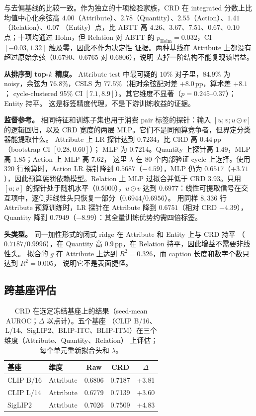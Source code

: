 \documentclass[10pt,twocolumn,a4paper]{ctexart}
\begin{document}
与去偏基线的比较一致。作为独立的十项检验家族，CRD 在 integrated 分数上比均值中心化余弦高
$4.00$（Attribute）、$2.78$（Quantity）、$2.55$（Action）、$1.41$（Relation）、$0.07$
（Entity）点，比 ABTT 高 $4.26$、$3.67$、$7.51$、$0.67$、$0.10$ 点；十项均通过 Holm，但
Relation 对 ABTT 的 $p_{\text{Holm}}=0.032$，CI $[-0.03,1.32]$ 触及零，因此不作为决定性
证据。两种基线在 Attribute 上都没有超过原始余弦（$0.6790$、$0.6765$ 对 $0.6806$），说明
去掉一阶结构不能复现该增益。

\textbf{从排序到 top-$k$ 精度。} Attribute test 中最可疑的 $10\%$ 对子里，$84.9\%$ 为
noisy，余弦为 $76.8\%$，CSLS 为 $77.5\%$（相对余弦配对差 $+8.0$\,pp，算术差 $+8.1$；
cycle-clustered 95\% CI $[7.1,8.9]$）。其它维度不显著（$p=0.245$--$0.37$）；Entity 持平。
这是标签精度代理，不是下游训练收益的证据。

\textbf{监督参考。} 相同特征和训练子集也用于消费 pair 标签的探针：输入 $[u;v;u\odot v]$
的逻辑回归，以及 CRD 宽度的两层 MLP。它们不是同预算竞争者，但界定分类器能提取什么。
Attribute 上 LR 探针达到 $0.7234$，比 CRD 高 $0.44$\,pp（bootstrap CI $[0.28,0.60]$）；
MLP 为 $0.7214$。Quantity 上探针高 $1.49$，MLP 高 $1.85$；Action 上 MLP 高 $7.62$，
这里 $\lambda$ 在 $80$ 个内部验证 cycle 上选择。使用 $320$ 行预算时，Action LR 探针降到
$0.5687$（$-4.59$），MLP 仍为 $0.6517$（$+3.71$），因此预算惩罚依赖模型。Relation 上 MLP
过拟合并低于 CRD $3.93$。只用 $[u;v]$ 的探针处于随机水平（$0.5000$），$u\odot v$ 达到
$0.6977$：线性可提取信号在交互项中，逐侧非线性头只恢复一部分（$0.6944$/$0.6956$）。
用同样 $8{,}336$ 行 Attribute 预算训练时，LR 探针在 Attribute 降到 $0.6751$（相对 CRD
$-4.39$），Quantity 降到 $0.7949$（$-8.99$）：其全量训练优势约需四倍标签。

\textbf{头类型。} 同一加性形式的闭式 ridge 在 Attribute 和 Entity 上与 CRD 持平
（$0.7187$/$0.9996$），在 Quantity 高 $0.9$\,pp，在 Relation 持平，因此增益不需要非线性头。
拟合的 $g$ 在 Attribute 上达到 $R^2=0.326$，而 caption 长度和数字个数只达到 $R^2=0.005$，
说明它不是表面捷径。

\subsection{跨基座评估}
\label{sec:cross-cn}
\begin{table}[t]
\centering
\small
\setlength{\tabcolsep}{3.5pt}
\caption{CRD 在选定冻结基座上的结果（seed-mean AUROC；$\Delta$ 以点计）。五个基座
（CLIP B/16、L/14、SigLIP2、BLIP-ITC、BLIP-ITM）在三个维度（Attribute、Quantity、Relation）
上评估；每个单元重新拟合头和 $\lambda$。}
\label{tab:cross-cn}
\begin{tabular}{llccc}
\toprule
基座 & 维度 & Raw & CRD & $\Delta$ \\
\midrule
CLIP B/16  & Attribute & 0.6806 & 0.7187 & +3.81 \\
CLIP L/14  & Attribute & 0.6779 & 0.7139 & +3.60 \\
SigLIP2    & Attribute & 0.7026 & 0.7509 & +4.83 \\
\bottomrule
\end{tabular}
\end{table}
\end{document}
